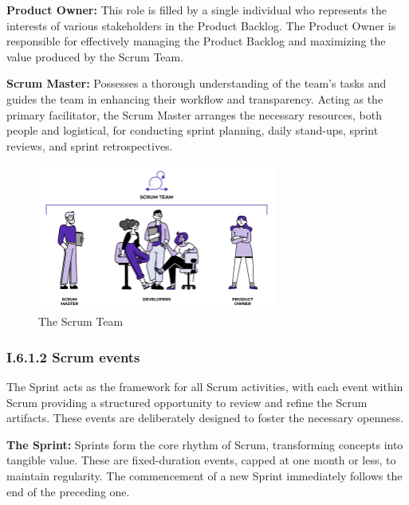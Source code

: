 \textbf{Product Owner:} This role is filled by a single individual who represents the interests of various stakeholders in the Product Backlog. The Product Owner is responsible for effectively managing the Product Backlog and maximizing the value produced by the Scrum Team.

\textbf{Scrum Master:} Possesses a thorough understanding of the team’s tasks and guides the team in enhancing their workflow and transparency. Acting as the primary facilitator, the Scrum Master arranges the necessary resources, both people and logistical, for conducting sprint planning, daily stand-ups, sprint reviews, and sprint retrospectives.



\begin{figure}[H]
    \centering
    \includegraphics[width=0.7\textwidth]{src/assets/chapters/scrumTeam.jpg}
    \caption{The Scrum Team}
    \label{fig:Scrum_Team_image}
\end{figure}




\subsubsection*{I.6.1.2 Scrum events}

The Sprint acts as the framework for all Scrum activities, with each event within Scrum providing a structured opportunity to review and refine the Scrum artifacts. These events are deliberately designed to foster the necessary openness.

\textbf{The Sprint:} Sprints form the core rhythm of Scrum, transforming concepts into tangible value. These are fixed-duration events, capped at one month or less, to maintain regularity. The commencement of a new Sprint immediately follows the end of the preceding one.

